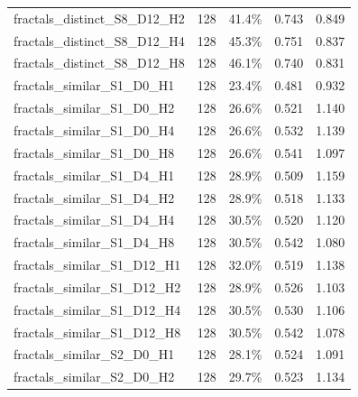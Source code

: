 \documentclass[11pt]{article}
\begin{document}
\begin{longtable}{p{}rrrr}
fractals\_\allowbreak{}distinct\_\allowbreak{}S8\_\allowbreak{}D12\_\allowbreak{}H2 & 128 & 41.4\% & 0.743 & 0.849\\
fractals\_\allowbreak{}distinct\_\allowbreak{}S8\_\allowbreak{}D12\_\allowbreak{}H4 & 128 & 45.3\% & 0.751 & 0.837\\
fractals\_\allowbreak{}distinct\_\allowbreak{}S8\_\allowbreak{}D12\_\allowbreak{}H8 & 128 & 46.1\% & 0.740 & 0.831\\
fractals\_\allowbreak{}similar\_\allowbreak{}S1\_\allowbreak{}D0\_\allowbreak{}H1 & 128 & 23.4\% & 0.481 & 0.932\\
fractals\_\allowbreak{}similar\_\allowbreak{}S1\_\allowbreak{}D0\_\allowbreak{}H2 & 128 & 26.6\% & 0.521 & 1.140\\
fractals\_\allowbreak{}similar\_\allowbreak{}S1\_\allowbreak{}D0\_\allowbreak{}H4 & 128 & 26.6\% & 0.532 & 1.139\\
fractals\_\allowbreak{}similar\_\allowbreak{}S1\_\allowbreak{}D0\_\allowbreak{}H8 & 128 & 26.6\% & 0.541 & 1.097\\
fractals\_\allowbreak{}similar\_\allowbreak{}S1\_\allowbreak{}D4\_\allowbreak{}H1 & 128 & 28.9\% & 0.509 & 1.159\\
fractals\_\allowbreak{}similar\_\allowbreak{}S1\_\allowbreak{}D4\_\allowbreak{}H2 & 128 & 28.9\% & 0.518 & 1.133\\
fractals\_\allowbreak{}similar\_\allowbreak{}S1\_\allowbreak{}D4\_\allowbreak{}H4 & 128 & 30.5\% & 0.520 & 1.120\\
fractals\_\allowbreak{}similar\_\allowbreak{}S1\_\allowbreak{}D4\_\allowbreak{}H8 & 128 & 30.5\% & 0.542 & 1.080\\
fractals\_\allowbreak{}similar\_\allowbreak{}S1\_\allowbreak{}D12\_\allowbreak{}H1 & 128 & 32.0\% & 0.519 & 1.138\\
fractals\_\allowbreak{}similar\_\allowbreak{}S1\_\allowbreak{}D12\_\allowbreak{}H2 & 128 & 28.9\% & 0.526 & 1.103\\
fractals\_\allowbreak{}similar\_\allowbreak{}S1\_\allowbreak{}D12\_\allowbreak{}H4 & 128 & 30.5\% & 0.530 & 1.106\\
fractals\_\allowbreak{}similar\_\allowbreak{}S1\_\allowbreak{}D12\_\allowbreak{}H8 & 128 & 30.5\% & 0.542 & 1.078\\
fractals\_\allowbreak{}similar\_\allowbreak{}S2\_\allowbreak{}D0\_\allowbreak{}H1 & 128 & 28.1\% & 0.524 & 1.091\\
fractals\_\allowbreak{}similar\_\allowbreak{}S2\_\allowbreak{}D0\_\allowbreak{}H2 & 128 & 29.7\% & 0.523 & 1.134\\

\end{longtable}
\end{document}
